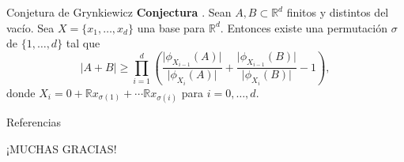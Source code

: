 \documentclass{beamer}
\begin{document}
\begin{frame}{Conjetura de Grynkiewicz}
    \textbf{Conjectura} \cite{alma9941126213902959}. Sean $A, B \subset \mathbb{R}^d$ finitos y distintos del vacío. Sea $X = \{x_1,\ldots, x_d\}$ una base para $\mathbb R^d$. Entonces existe una permutación $\sigma$ de $\{1,\ldots, d\}$ tal que 
    $$\lvert A + B \rvert \geq \prod_{i=1}^d \left( \frac{\lvert \phi_{X_{i-1}}(A) \rvert}{\lvert \phi_{X_i}(A) \rvert} + \frac{\lvert \phi_{X_{i-1}}(B) \rvert}{\lvert \phi_{X_i}(B) \rvert} - 1 \right),$$
    donde $X_i = 0 + \mathbb R x_{\sigma(1)} + \cdots \mathbb R x_{\sigma(i)}$ para $i = 0, \ldots, d.$
\end{frame}


    



\begin{frame}{Referencias}
\small
\printbibliography
\end{frame}

\begin{frame}{}
\centering
    \Large ¡MUCHAS GRACIAS!
\end{frame}
\end{document}
